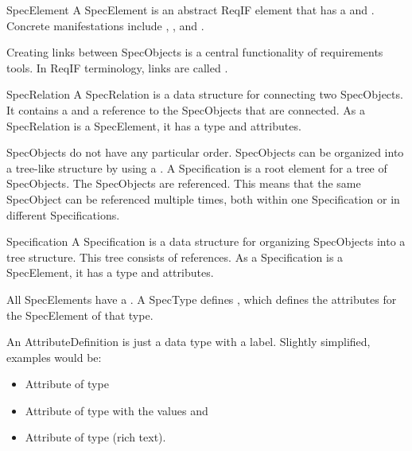 \begin{definition}{SpecElement}
A SpecElement is an abstract ReqIF element that has a  and .  Concrete manifestations include , ,  and .
\end{definition}

Creating links between SpecObjects is a central functionality of requirements tools.  In ReqIF terminology, links are called .

\begin{definition}{SpecRelation}
A SpecRelation is a data structure for connecting two SpecObjects.  It contains a  and a  reference to the SpecObjects that are connected.  As a SpecRelation is a SpecElement, it has a type and attributes.
\end{definition}

SpecObjects do not have any particular order.  SpecObjects can be organized into a tree-like structure by using a .  A Specification is a root element for a tree of SpecObjects.  The SpecObjects are referenced.  This means that the same SpecObject can be referenced multiple times, both within one Specification or in different Specifications.

\begin{definition}{Specification}
A Specification is a data structure for organizing SpecObjects into a tree structure.  This tree consists of references.  As a Specification is a SpecElement, it has a type and attributes.
\end{definition}

All SpecElements have a .  A SpecType defines , which defines the attributes for the SpecElement of that type.  

\begin{example}
An AttributeDefinition is just a data type with a label.  Slightly simplified, examples would be:
\begin{itemize}
\item Attribute  of type 
\item Attribute  of type  with the values  and 
\item Attribute  of type  (rich text).
\end{itemize}
\end{example}

